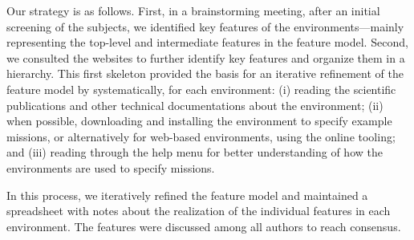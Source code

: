 Our strategy is as follows.
First, in a brainstorming meeting, after an initial screening of the subjects, we identified key features of the environments---mainly representing the top-level and intermediate features in the feature model. Second, we consulted the websites to further identify key features and organize them in a hierarchy. This first skeleton provided the basis for an iterative refinement of the feature model by systematically, for each environment: (i) reading the scientific publications and other technical documentations about the environment; (ii) when possible, downloading and installing the environment to specify example missions, or alternatively for web-based environments, using the online tooling; and (iii) reading through the help menu for better understanding of how the environments are used to specify missions.

In this process, we iteratively refined the feature model and maintained a spreadsheet with notes about the realization of the individual features in each environment. The features were discussed among all authors to reach consensus.


%
%
%

